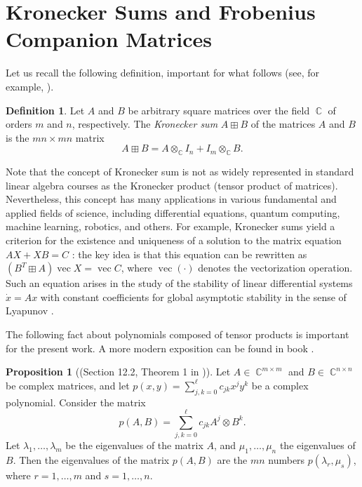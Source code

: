 \documentclass[14pt, dvipsnames]{extarticle}
\theoremstyle{definition}
\newtheorem{prop}{Proposition}
\theoremstyle{definition}
\newtheorem{defi}{Definition}
\theoremstyle{remark}
\DeclareMathOperator{\Cc}{\mathbb{C}}
\DeclareMathOperator{\vecc}{\mathrm{vec}}
\begin{document}
\section{Kronecker Sums and Frobenius Companion Matrices}\label{Kronecker_sums_and_companions}

Let us recall the following definition, important for what follows (see, for example, \cite[Definition 4.4.4]{Horn}).

\begin{defi}\label{Kronecker_sum}
Let $A$ and $B$ be arbitrary square matrices over the field $\Cc$ of orders $m$ and $n$, respectively. The {\it Kronecker sum} $A\boxplus B$ of the matrices $A$ and $B$ is the $mn\times mn$ matrix
$$A\boxplus B = A\otimes_{\Cc} I_n + I_m\otimes_{\Cc} B.$$
\end{defi}

Note that the concept of Kronecker sum is not as widely represented in standard linear algebra courses as the Kronecker product (tensor product of matrices). Nevertheless, this concept has many applications in various fundamental and applied fields of science, including differential equations, quantum computing, machine learning, robotics, and others. For example, Kronecker sums yield a criterion for the existence and uniqueness of a solution to the matrix equation $AX + XB = C$ \cite[Theorem 4.4.6]{Horn}: the key idea is that this equation can be rewritten as $(B^{T}\boxplus A)\vecc X = \vecc C$, where $\vecc(\cdot)$ denotes the vectorization operation. Such an equation arises in the study of the stability of linear differential systems $\dot{x} = Ax$ with constant coefficients for global asymptotic stability in the sense of Lyapunov \cite[Chapter XV, Section 5, Theorem 3, Theorem 3']{Gantmacher}. 

The following fact \cite{Stephanos} about polynomials composed of tensor products is important for the present work. A more modern exposition can be found in book \cite{Lancaster}.

\begin{prop}[(Section 12.2, Theorem 1 in \cite{Lancaster})]\label{Stephanos}
Let $A\in \Cc^{m\times m}$ and $B\in \Cc^{n\times n}$ be complex matrices, and let $p(x, y) = \sum\limits_{j, k = 0}^{\ell}c_{jk}x^j y^k$ be a complex polynomial. Consider the matrix
$$p(A, B) = \sum\limits_{j, k = 0}^\ell c_{jk}A^j\otimes B^k.$$ 
Let $\lambda_1, \dots, \lambda_m$ be the eigenvalues of the matrix $A$, and $\mu_1, \dots, \mu_n$ the eigenvalues of $B$. Then the eigenvalues of the matrix $p(A, B)$ are the $mn$ numbers $p(\lambda_r, \mu_s)$, where $r = 1, \dots, m$ and $s = 1, \dots, n$.  
\end{prop}
\end{document}
